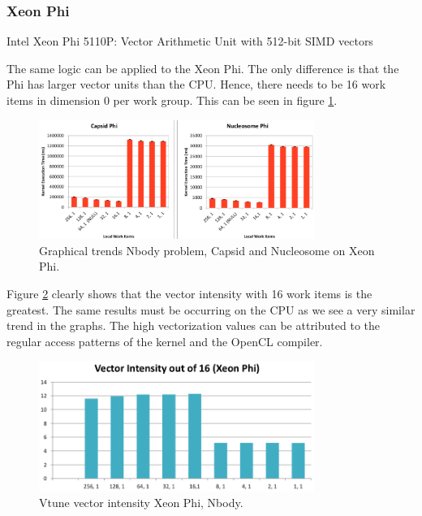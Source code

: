 \subsubsection{Xeon Phi}
\par{Intel Xeon Phi 5110P: Vector Arithmetic Unit with 512-bit SIMD vectors}

\par{The same logic can be applied to the Xeon Phi. The only 
    difference is that the Phi has larger vector units than the CPU. 
    Hence, there needs to be 16 work items in dimension 0 per work group. 
    This can be seen in figure \ref{nbody_phi}.}

\begin{figure}[!h]
    \centering
    \includegraphics[width=0.8\textwidth]{figures/nbody_phi.png}
    \caption{Graphical trends Nbody problem, Capsid and Nucleosome on Xeon Phi.}
    \label{nbody_phi}
\end{figure}

\par{Figure \ref{nbody_phi_vec} clearly shows that the vector intensity with 16 work items 
    is the greatest. The same results must be occurring on the CPU as 
    we see a very similar trend in the graphs. 
    The high vectorization values can be attributed to the 
    regular access patterns of the kernel and the OpenCL compiler.}

\begin{figure}[!h]
    \centering
    \includegraphics[width=0.8\textwidth]{figures/nbody_phi_vec.png}
    \caption{Vtune vector intensity Xeon Phi, Nbody.}
    \label{nbody_phi_vec}
\end{figure}

